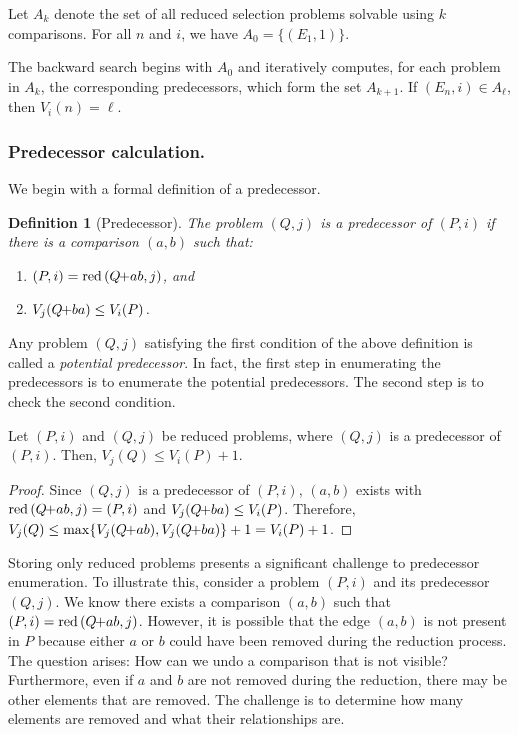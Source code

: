 \documentclass[twoside,leqno,twocolumn]{article}
\newcommand{\pchild}[3]{{#1}\kern-1pt{+}{#2}{#3}}
\newcommand{\reduced}[1]{\operatorname{red}{#1}}
\newtheorem{definition}{Definition}[section]
\begin{document}
Let $A_k$ denote the set of all reduced selection problems solvable using $k$ comparisons.
For all $n$ and $i$, we have $A_0 = \{(E_1, 1)\}$.

The backward search begins with $A_0$ and iteratively computes, for each problem in $A_k$, the corresponding predecessors, which form the set $A_{k + 1}$.
If $(E_n, i) \in A_\ell$, then $V_i(n) = \ell$.

\subsubsection{Predecessor calculation.} \label{sec:backward:predecessor_calculation}
We begin with a formal definition of a predecessor.

\begin{definition}[Predecessor] \label{definition:predecessor_calculation}
  The problem $(Q, j)$ is a \emph{predecessor} of $(P, i)$ if there is a comparison $(a, b)$ such that:
  \begin{enumerate}
    \item $(P, i) = \reduced(\pchild{Q}{a}{b}, j)$, and
    \item $V_j(\pchild{Q}{b}{a}) \leq V_i(P)$.
  \end{enumerate}
\end{definition}

Any problem $(Q, j)$ satisfying the first condition of the above definition is called a \emph{potential predecessor}.
In fact, the first step in enumerating the predecessors is to enumerate the potential predecessors.
The second step is to check the second condition.

\begin{lemma} \label{lemma:predecessor_calculation}
  Let $(P, i)$ and $(Q, j)$ be reduced problems, where $(Q, j)$ is a predecessor of $(P, i)$.
  Then, $V_j(Q) \leq V_i(P) + 1$.
\end{lemma}

\begin{proof} \label{proof:predecessor_calculation}
  Since $(Q, j)$ is a predecessor of $(P, i)$, $(a, b)$ exists with $\reduced{(\pchild{Q}{a}{b}, j)} = (P, i)$ and $V_j(\pchild{Q}{b}{a}) \leq V_i(P)$.
  Therefore, $V_j(Q) \leq \max\{V_j(\pchild{Q}{a}{b}), V_j(\pchild{Q}{b}{a})\} + 1 = V_i(P) + 1$.
\end{proof}

Storing only reduced problems presents a significant challenge to predecessor enumeration.
To illustrate this, consider a problem $(P, i)$ and its predecessor $(Q, j)$.
We know there exists a comparison $(a, b)$ such that $(P, i) = \reduced(\pchild{Q}{a}{b}, j)$.
However, it is possible that the edge $(a, b)$ is not present in $P$ because either $a$ or $b$ could have been removed during the reduction process.
The question arises: How can we undo a comparison that is not visible?
Furthermore, even if $a$ and $b$ are not removed during the reduction, there may be other elements that are removed.
The challenge is to determine how many elements are removed and what their relationships are.
\end{document}
